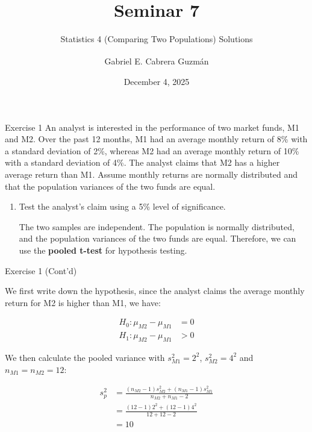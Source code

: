 \documentclass[
  ignorenonframetext,
  aspectratio=43,
]{beamer}
\title[Seminar 7]{Seminar
7\daggerfootnote{\texttt{gabriel.cabreraguzman@postgrad.manchester.ac.uk}}}
\subtitle{Statistics 4 (Comparing Two Populations) Solutions}
\author[Gabriel E. Cabrera Guzmán]{
    {Gabriel E. Cabrera
Guzmán\textsuperscript{\normalsize\orcidlink{0000-0000-0000-0000}}} \medskip
}
\date{December 4, 2025}
\institute[]{
    The University of Manchester\\
Alliance Manchester Business School \bigskip
}
\let\olditem\item
\renewcommand\item{\olditem\justifying}
\begin{document}
\frame{\titlepage}
\ifdefined\Shaded\renewenvironment{Shaded}{\begin{tcolorbox}[borderline west={3pt}{0pt}{shadecolor}, boxrule=0pt, interior hidden, frame hidden, sharp corners, breakable, enhanced]}{\end{tcolorbox}}\fi

\begin{frame}{Exercise 1}
\protect\hypertarget{exercise-1}{}
An analyst is interested in the performance of two market funds, M1 and
M2. Over the past 12 months, M1 had an average monthly return of 8\%
with a standard deviation of 2\%, whereas M2 had an average monthly
return of 10\% with a standard deviation of 4\%. The analyst claims that
M2 has a higher average return than M1. Assume monthly returns are
normally distributed and that the population variances of the two funds
are equal.

\begin{enumerate}
\item
  Test the analyst's claim using a 5\% level of significance.

  \pause

  The two samples are independent. The population is normally
  distributed, and the population variances of the two funds are equal.
  Therefore, we can use the \textbf{pooled t-test} for hypothesis
  testing.
\end{enumerate}
\end{frame}

\begin{frame}{Exercise 1 (Cont'd)}
\protect\hypertarget{exercise-1-contd}{}
\pause

We first write down the hypothesis, since the analyst claims the average
monthly return for M2 is higher than M1, we have: \vspace{-5pt}

\pause

\[
\begin{aligned}
H_0: \mu_{M2} - \mu_{M1} &= 0 \\
H_1: \mu_{M2} - \mu_{M1} &> 0
\end{aligned}
\]

\pause

We then calculate the pooled variance with \(s_{M1}^2 = 2^2\),
\(s_{M2}^2 = 4^2\) and \(n_{M1} = n_{M2} = 12\):

\pause

\[
\begin{aligned}
s_p^2 &= \frac{(n_{M2}-1)s_{M2}^2 + (n_{M1}-1)s_{M1}^2}{n_{M2}+n_{M1}-2} \\
      &= \frac{(12-1) 2^2 + (12-1) 4^2}{12+12-2} \\
      &= 10
\end{aligned}
\]
\end{frame}
\end{document}
